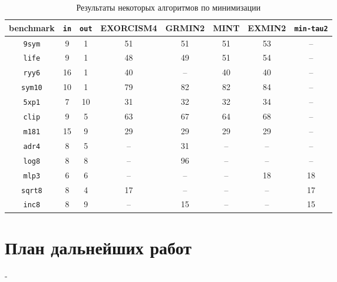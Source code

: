 \documentclass[a4paper,12pt,titlepage,finall]{article}
\begin{document}
\begin{table}[h]
\centering
\begin{tabular}{ |c||c|c||c|c|c|c|c| }
\hline
{\bf benchmark} & \texttt{\bf in} & \texttt{\bf out} & {\sc EXORCISM4} & {\sc GRMIN2} & {\sc MINT} & {\sc EXMIN2} & \texttt{min-tau2} \\
\hline\hline
\texttt{9sym}   & 9  & 1  & 51 & 51 & 51 & 53 & – \\
\hline
\texttt{life}   & 9  & 1  & 48 & 49 & 51 & 54 & – \\
\hline
\texttt{ryy6}   & 16 & 1  & 40 & –  & 40 & 40 & – \\
\hline
\texttt{sym10}  & 10 & 1  & 79 & 82 & 82 & 84 & – \\
\hline\hline
\texttt{5xp1}   & 7  & 10 & 31 & 32 & 32 & 34 & – \\
\hline
\texttt{clip}   & 9  & 5  & 63 & 67 & 64 & 68 & – \\
\hline
\texttt{m181}   & 15 & 9  & 29 & 29 & 29 & 29 & – \\
\hline\hline
\texttt{adr4}   & 8  & 5  & –  & 31 & –  & –  & – \\
\hline
\texttt{log8}   & 8  & 8  & –  & 96 & –  & –  & – \\
\hline
\texttt{mlp3}   & 6  & 6  & –  & –  & –  & 18 & 18 \\
\hline
\texttt{sqrt8}  & 8  & 4  & 17 & –  & –  & –  & 17 \\
\hline
\texttt{inc8}   & 8  & 9  & –  & 15 & –  & –  & 15 \\
\hline
\end{tabular}
\caption{Результаты некоторых алгоритмов по минимизации}
\label{table_benchmark}
\end{table}


\section{План дальнейших работ}


-
\end{document}

